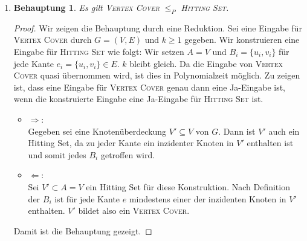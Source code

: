 \documentclass[a4paper]{scrartcl}
\newtheorem*{proposition}{Behauptung}
\begin{document}
\begin{enumerate}[label=\bfseries \arabic*.]
\begin{enumerate}
\begin{proof}
\begin{enumerate}
            \end{enumerate}
            Aus i. und ii. folgt, dass \textsc{Hitting Set} $NP$-vollständig ist.
        \end{proof}

    \item
        \begin{proposition}
            Es gilt \textsc{Vertex Cover} $\leq_P$ \textsc{Hitting Set}.
        \end{proposition}
        \begin{proof}
            Wir zeigen die Behauptung durch eine Reduktion.  Sei eine Eingabe
            für \textsc{Vertex Cover} durch $G = (V, E)$ und $k \geq 1$
            gegeben. Wir konstruieren eine Eingabe für \textsc{Hitting Set} wie
            folgt: Wir setzen $A = V$ und $B_i = \{u_i, v_i\}$ für jede Kante
            $e_i = \{u_i, v_i\} \in E$. $k$ bleibt gleich.
            Da die Eingabe von \textsc{Vertex Cover} quasi übernommen wird, ist
            dies in Polynomialzeit möglich.
            Zu zeigen ist, dass eine Eingabe für \textsc{Vertex Cover} genau
            dann eine Ja-Eingabe ist, wenn die konstruierte Eingabe eine
            Ja-Eingabe für \textsc{Hitting Set} ist.
            \begin{itemize}
                \item $\Rightarrow$: \\
                    Gegeben sei eine Knotenüberdeckung $V' \subseteq V$ von
                    $G$. Dann ist $V'$ auch ein Hitting Set, da zu jeder Kante
                    ein inzidenter Knoten in $V'$ enthalten ist und somit jedes
                    $B_i$ getroffen wird.

                \item $\Leftarrow$: \\
                    Sei $V' \subset A = V$ ein Hitting Set für diese
                    Konstruktion. Nach Definition der $B_i$ ist für jede Kante
                    $e$ mindestens einer der inzidenten Knoten in $V'$
                    enthalten. $V'$ bildet also ein \textsc{Vertex Cover}.
            \end{itemize}
            Damit ist die Behauptung gezeigt.
        \end{proof}

\end{enumerate}

\end{enumerate}
\end{document}
